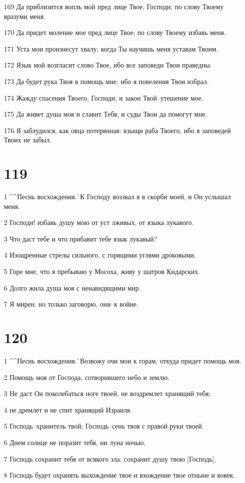 \par 169 Да приблизится вопль мой пред лице Твое, Господи; по слову Твоему вразуми меня.
\par 170 Да придет моление мое пред лице Твое; по слову Твоему избавь меня.
\par 171 Уста мои произнесут хвалу, когда Ты научишь меня уставам Твоим.
\par 172 Язык мой возгласит слово Твое, ибо все заповеди Твои праведны.
\par 173 Да будет рука Твоя в помощь мне, ибо я повеления Твои избрал.
\par 174 Жажду спасения Твоего, Господи, и закон Твой--утешение мое.
\par 175 Да живет душа моя и славит Тебя, и суды Твои да помогут мне.
\par 176 Я заблудился, как овца потерянная: взыщи раба Твоего, ибо я заповедей Твоих не забыл.

\chapter{119}

\par 1 ^^Песнь восхождения.^^ К Господу воззвал я в скорби моей, и Он услышал меня.
\par 2 Господи! избавь душу мою от уст лживых, от языка лукавого.
\par 3 Что даст тебе и что прибавит тебе язык лукавый?
\par 4 Изощренные стрелы сильного, с горящими углями дроковыми.
\par 5 Горе мне, что я пребываю у Мосоха, живу у шатров Кидарских.
\par 6 Долго жила душа моя с ненавидящими мир.
\par 7 Я мирен: но только заговорю, они--к войне.

\chapter{120}

\par 1 ^^Песнь восхождения.^^ Возвожу очи мои к горам, откуда придет помощь моя.
\par 2 Помощь моя от Господа, сотворившего небо и землю.
\par 3 Не даст Он поколебаться ноге твоей, не воздремлет хранящий тебя;
\par 4 не дремлет и не спит хранящий Израиля.
\par 5 Господь--хранитель твой; Господь--сень твоя с правой руки твоей.
\par 6 Днем солнце не поразит тебя, ни луна ночью.
\par 7 Господь сохранит тебя от всякого зла; сохранит душу твою [Господь].
\par 8 Господь будет охранять выхождение твое и вхождение твое отныне и вовек.

